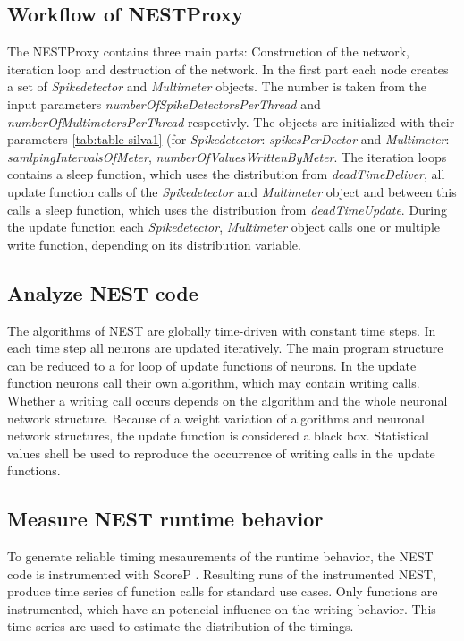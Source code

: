 \documentclass[]{YIC2015}
\begin{document}
\subsection{Workflow of NESTProxy}
The NESTProxy contains three main parts: Construction of the network, iteration loop and destruction of the network.
In the first part each node creates a set of \emph{Spikedetector} and \emph{Multimeter} objects.
The number is taken from the input parameters \emph{numberOfSpikeDetectorsPerThread} and \emph{numberOfMultimetersPerThread} respectivly.
The objects are initialized with their parameters \ref{tab:table-silva1}
(for \emph{Spikedetector}: \emph{spikesPerDector} and \emph{Multimeter}: \emph{samlpingIntervalsOfMeter}, \emph{numberOfValuesWrittenByMeter}.
The iteration loops contains a sleep function, which uses the distribution from \emph{deadTimeDeliver},
all update function calls of the \emph{Spikedetector} and \emph{Multimeter} object and between this calls 
a sleep function, which uses the distribution from \emph{deadTimeUpdate}.
During the update function each \emph{Spikedetector}, \emph{Multimeter} object calls one or multiple write function, depending on its distribution variable.


\subsection{Analyze NEST code}
The algorithms of NEST are globally time-driven with constant time steps.
In each time step all neurons are updated iteratively.
The main program structure can be reduced to a for loop of update functions of neurons.
In the update function neurons call their own algorithm, which may contain writing calls.
Whether a writing call occurs depends on the algorithm and the whole neuronal network structure.
Because of a weight variation of algorithms and neuronal network structures, the update function is considered a black box.
Statistical values shell be used to reproduce the occurrence of writing calls in the update functions.

\subsection{Measure NEST runtime behavior}
To generate reliable timing mesaurements of the runtime behavior,
the NEST code is instrumented with ScoreP \cite{scoreP}.
Resulting runs of the instrumented NEST,
produce time series of function calls for standard use cases.
Only functions are instrumented, which have an potencial influence on the writing behavior.
This time series are used to estimate the distribution of the timings.
\end{document}
